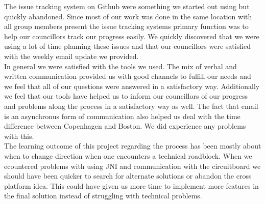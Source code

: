 The issue tracking system on Github were something we started out using but quickly abandoned. Since most of our work was done in the same location with all group members present the issue tracking systems primary function was to help our councillors track our progress easily. We quickly discovered that we were using a lot of time planning these issues and that our councillors were satisfied with the weekly email update we provided. \\

In general we were satisfied with the tools we used. The mix of verbal and written communication provided us with good channels to fulfill our needs and we feel that all of our questions were answered in a satisfactory way. Additionally we feel that our tools have helped us to inform our councillors of our progress and problems along the process in a satisfactory way as well. The fact that email is an asynchronus form of communication also helped us deal with the time difference between Copenhagen and Boston. We did experience any problems with this. \\

The learning outcome of this project regarding the process has been mostly about when to change direction when one encounters a technical roadblock. When we ecountered problems with using JNI and communication with the circuitboard we should have been quicker to search for alternate solutions or abandon the cross platform idea. This could have given us more time to implement more features in the final solution instead of struggling with technical problems.